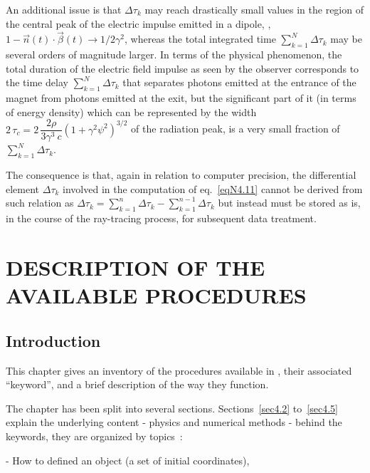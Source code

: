 \medskip

\noindent An additional issue is that  $ \Delta \tau_k$ may reach drastically small values 
in the region of the central peak of the electric impulse emitted in 
a dipole, \ie, $1 - \vec{n}(t) \cdot \vec{\beta} (t) \to
1/2\gamma^2$, whereas the total integrated time $\sum_{k=1}^{N} \Delta \tau_k$ may be several
orders of magnitude larger. In terms of the physical phenomenon, the total duration of the electric 
field impulse as seen by the observer corresponds to the time delay $ \sum_{k=1}^{N} \Delta \tau_k$
that separates photons emitted at the
entrance of the magnet from photons emitted at the exit, but the significant  part of it
(in terms of energy density) which can be represented by the width 
$ 2\, \tau_c = 2\, \dfrac{2\rho }{ 3\gamma^3~c} (1 +\gamma^2\psi^2)^{3/2}$ of the  
radiation peak, is a very small fraction of $ \sum_{k=1}^{N} \Delta \tau_k$.

\noindent The consequence is that, again in relation to computer precision, the
differential  element $\Delta \tau_k$ involved in the computation of 
eq.~\ref{eqN4.11} cannot be derived from such relation as 
 $\Delta\tau_k = \sum_{k=1}^{n} \Delta\tau_k - \sum_{k=1}^{n-1} \Delta \tau_k$ 
but instead must be stored as is,  in the course of the ray-tracing process, for 
subsequent data treatment. 


\clearemptydoublepage

\section{DESCRIPTION OF THE AVAILABLE PROCEDURES} \label{sec4}

\subsection{Introduction} \label{4.1} 


This chapter gives an inventory of the  procedures available in \zgoubi, 
 their associated ``keyword'',  and a brief  description  of the way  they function. 

\medskip 
 
\noindent The chapter  has been 
split into several sections. Sections~\ref{sec4.2} to~\ref{sec4.5} explain the 
underlying content - physics and numerical  methods -  behind the  keywords, they are organized by topics~: 

- How to defined an object (a set of initial coordinates), 

